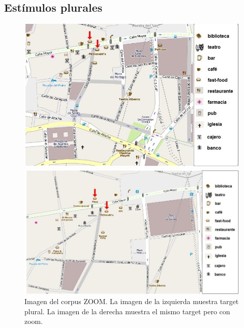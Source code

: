 \subsection{Est\'imulos plurales}
\begin{figure}
\begin{minipage}[b]{0.48\linewidth}
\centering
\includegraphics[width=\textwidth]{images/corpus/mapa8.png}
\caption{}
\label{mapa7}
\end{minipage}
\hspace*{0cm}
\begin{minipage}[b]{0.55\linewidth}
\centering
\includegraphics[width=\textwidth]{images/corpus/mapa18.png}
\caption{}
\label{mapa8}
\end{minipage}
\caption{Imagen del corpus ZOOM. La imagen de la izquierda muestra target plural. La imagen de la derecha muestra el mismo target pero con zoom.}
\end{figure}

